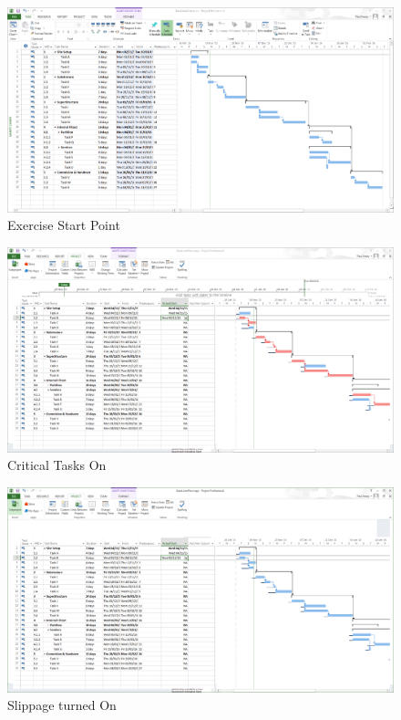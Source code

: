 \begin{figure}[hb]
	\centering
		\includegraphics[width=1.00\textwidth]{img/P4ProjectPlan.PNG}
	\caption{Exercise Start Point}
	\label{fig:P4ProjectPlan}
\end{figure}


\begin{figure}[hb]
	\centering
		\includegraphics[width=1.00\textwidth]{img/CriticalTasks.PNG}
	\caption{Critical Tasks On}
	\label{fig:P4Critical}
\end{figure}



\begin{figure}[hb]
	\centering
		\includegraphics[width=1.00\textwidth]{img/Slippage.PNG}
	\caption{Slippage turned On}
	\label{fig:P4Slippage}
\end{figure}

